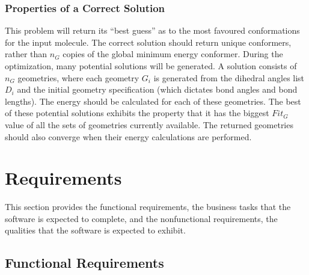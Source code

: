 \documentclass[12pt]{article}
\begin{document}
\subsubsection{Properties of a Correct Solution} \label{sec_CorrectSolution}

\noindent
This problem will return its ``best guess'' as to the most favoured 
conformations for the input molecule. The correct solution should return unique 
conformers, rather than $n_G$ copies of the global minimum energy conformer. 
During the optimization, many potential solutions will be generated. A solution 
consists of $n_G$ geometries, where each geometry $G_i$ is generated from the 
dihedral angles list $D_i$ and the initial geometry specification (which 
dictates bond angles and bond lengths). The energy should be calculated for 
each of these geometries. The best of these potential solutions exhibits the 
property that it has the biggest $Fit_G$ value of all the sets of geometries 
currently available. The returned geometries should also converge when their 
energy calculations are performed.

\section{Requirements} \label{section-require}

This section provides the functional requirements, the business tasks that the
software is expected to complete, and the nonfunctional requirements, the
qualities that the software is expected to exhibit.

\subsection{Functional Requirements}
\end{document}
